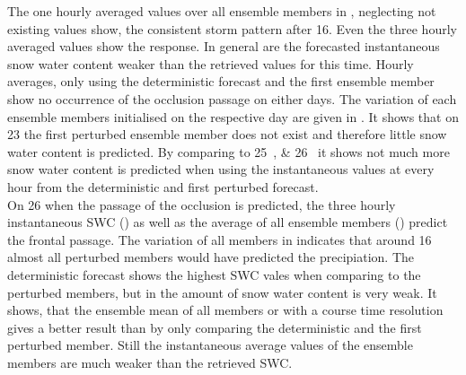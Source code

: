 The one hourly averaged values over all ensemble members in , neglecting not existing values show, the consistent storm pattern after \SI{16}{\UTC}. Even the three hourly averaged values show the response. In general are the forecasted instantaneous snow water content weaker than the retrieved values for this time. Hourly averages, only using the deterministic forecast and the first ensemble member show no occurrence of the occlusion passage on either days. The variation of each ensemble members initialised on the respective day are given in . It shows that on \SI{23}{\dec} the first perturbed ensemble member does not exist and therefore little snow water content is predicted. By comparing to \SIlist{25;26}{\dec} it shows not much more snow water content is predicted when using the instantaneous values at every hour from the deterministic and first perturbed forecast. 
\\ 
On \SI{26}{\dec} when the passage of the occlusion is predicted, the three hourly instantaneous SWC () as well as the average of all ensemble members () predict the frontal passage. The variation of all members in  indicates that around \SI{16}{\UTC} almost all perturbed members would have predicted the precipiation. The deterministic forecast shows the highest SWC vales when comparing to the perturbed members, but in  the amount of snow water content is very weak. It shows, that the ensemble mean of all members or with a course time resolution gives a better result than by only comparing the deterministic and the first perturbed member. Still the instantaneous average values of the ensemble members are much weaker than the retrieved SWC.
